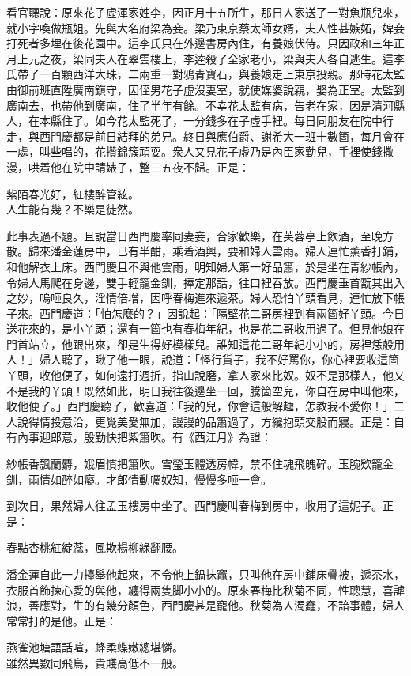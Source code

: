 看官聽說：原來花子虛渾家姓李，因正月十五所生，那日人家送了一對魚瓶兒來，就小字喚做瓶姐。先與大名府梁為妾。梁乃東京蔡太師女婿，夫人性甚嫉妬，婢妾打死者多埋在後花園中。這李氏只在外邊書房內住，有養娘伏侍。只因政和三年正月上元之夜，梁同夫人在翠雲樓上，李逵殺了全家老小，{}梁與夫人各自逃生。這李氏帶了一百顆西洋大珠，{}二兩重一對鴉青寶石，與養娘走上東京投親。那時花太監由御前班直陞廣南鎭守，因侄男花子虛沒妻室，就使媒婆說親，娶為正室。太監到廣南去，也帶他到廣南，住了半年有餘。不幸花太監有病，告老在家，因是清河縣人，在本縣住了。如今花太監死了，一分錢多在子虛手裡。每日同朋友在院中行走，與西門慶都是前日結拜的弟兄。終日與應伯爵、謝希大一班十數箇，每月會在一處，叫些唱的，花攢錦簇頑耍。衆人又見花子虛乃是內臣家勤兒，手裡使錢撒漫，哄着他在院中請婊子，整三五夜不歸。正是：

\begin{myquote}
紫陌春光好，紅樓醉管絃。\\人生能有幾？不樂是徒然。
\end{myquote}

此事表過不題。且說當日西門慶率同妻妾，合家歡樂，在芙蓉亭上飲酒，至晚方散。歸來潘金蓮房中，已有半酣，乘着酒興，要和婦人雲雨。婦人連忙薰香打鋪，和他解衣上床。西門慶且不與他雲雨，明知婦人第一好品簫，於是坐在青紗帳內，令婦人馬爬在身邊，雙手輕籠金釧，捧定那話，往口裡吞放。西門慶垂首翫其出入之妙，嗚咂良久，淫情倍增，因呼春梅進來遞茶。{}婦人恐怕丫頭看見，連忙放下帳子來。西門慶道：「怕怎麼的？」因說起：「隔壁花二哥房裡到有兩箇好丫頭。今日送花來的，是小丫頭；還有一箇也有春梅年紀，也是花二哥收用過了。但見他娘在門首站立，{}他跟出來，卻是生得好模樣兒。誰知這花二哥年紀小小的，房裡恁般用人！」{}婦人聽了，瞅了他一眼，說道：「怪行貨子，我不好罵你，你心裡要收這箇丫頭，{}收他便了，如何遠打週折，指山說磨，拿人家來比奴。奴不是那樣人，他又不是我的丫頭！既然如此，明日我往後邊坐一回，騰箇空兒，你自在房中叫他來，收他便了。」{}西門慶聽了，歡喜道：「我的兒，你會這般解趣，怎教我不愛你！」二人說得情投意洽，更覺美愛無加，謾謾的品簫過了，方纔抱頭交股而寢。正是：自有內事迎郎意，殷勤快把紫簫吹。有《西江月》為證：

\begin{myquote}
紗帳香飄蘭麝，娥眉慣把簫吹。雪瑩玉體透房幃，禁不住魂飛魄碎。玉腕欵籠金釧，兩情如醉如癡。才郎情動囑奴知，慢慢多咂一會。
\end{myquote}

到次日，果然婦人往孟玉樓房中坐了。西門慶叫春梅到房中，收用了這妮子。正是：

\begin{myquote}
春點杏桃紅綻蕊，風欺楊柳綠翻腰。
\end{myquote}

潘金蓮自此一力擡舉他起來，不令他上鍋抹竈，只叫他在房中鋪床疊被，遞茶水，衣服首飾揀心愛的與他，纏得兩隻脚小小的。原來春梅比秋菊不同，性聰慧，喜謔浪，善應對，生的有幾分顏色，西門慶甚是寵他。秋菊為人濁蠢，不諳事體，婦人常常打的是他。正是：

\begin{myquote}
燕雀池塘語話喧，蜂柔蝶嫩總堪憐。\\雖然異數同飛鳥，貴賤高低不一般。
\end{myquote}

